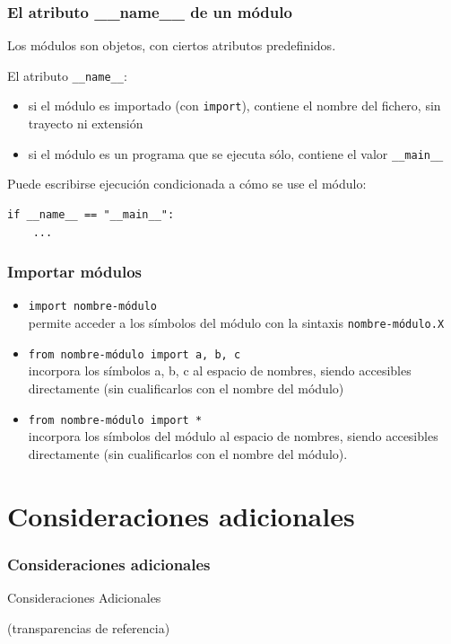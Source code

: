 \documentclass{beamer}
\begin{document}
\begin{frame}[fragile]
\frametitle{El atributo \_\_name\_\_ de un módulo}

Los módulos son objetos, con ciertos atributos predefinidos.

El atributo \verb|__name__|:
\begin{itemize}
\item si el módulo es importado (con \verb|import|), contiene el
  nombre del fichero, sin trayecto ni extensión
\item si el módulo es un programa que se ejecuta sólo, contiene el
  valor \verb|__main__|
\end{itemize}

Puede escribirse ejecución condicionada a cómo se use el módulo:
\begin{footnotesize}
\begin{verbatim}
if __name__ == "__main__": 
    ...
\end{verbatim}
\end{footnotesize}
  
\end{frame}


\begin{frame}[fragile]
\frametitle{Importar módulos}

\begin{itemize}
\item \verb|import nombre-módulo               | \\permite acceder a los
  símbolos del módulo con la sintaxis \verb|nombre-módulo.X|
\item \verb|from nombre-módulo import a, b, c  | \\incorpora
  los símbolos a, b, c al espacio de nombres, siendo accesibles
  directamente (sin cualificarlos con el nombre del módulo)
\item \verb|from nombre-módulo import *        | \\incorpora los
  símbolos del módulo al espacio de nombres, siendo accesibles
  directamente (sin cualificarlos con el nombre del módulo).
\end{itemize}
\end{frame}



\section{Consideraciones adicionales}

\begin{frame}[fragile]
\frametitle{Consideraciones adicionales}

\begin{center}
{\Huge Consideraciones Adicionales}

{\footnotesize (transparencias de referencia)}
\end{center}


\end{frame}
\end{document}
